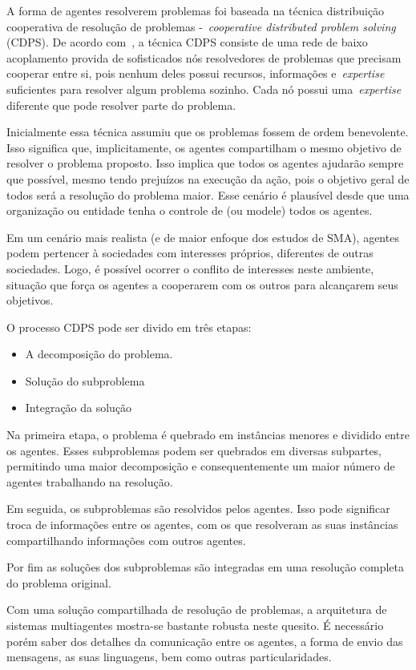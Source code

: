 A forma de agentes resolverem problemas foi baseada na técnica distribuição cooperativa de resolução de problemas -~\emph{cooperative distributed problem solving} (CDPS). De acordo com~\cite{durfee89}, a técnica CDPS consiste de uma rede de baixo acoplamento provida de sofisticados nós resolvedores de problemas que precisam cooperar entre si, pois nenhum deles possui recursos, informações e~\emph{expertise} suficientes para resolver algum problema sozinho. Cada nó possui uma~\emph{expertise} diferente que pode resolver parte do problema.

Inicialmente essa técnica assumiu que os problemas fossem de ordem benevolente. Isso significa que, implicitamente, os agentes compartilham o mesmo objetivo de resolver o problema proposto. Isso implica que todos os agentes ajudarão sempre que possível, mesmo tendo prejuízos na execução da ação, pois o objetivo geral de todos será a resolução do problema maior. Esse cenário é plausível desde que uma organização ou entidade tenha o controle de (ou modele) todos os agentes.

Em um cenário mais realista (e de maior enfoque dos estudos de SMA), agentes podem pertencer à sociedades com interesses próprios, diferentes de outras sociedades. Logo, é possível ocorrer o conflito de interesses neste ambiente, situação que força os agentes a cooperarem com os outros para alcançarem seus objetivos.

O processo CDPS pode ser divido em três etapas:
\begin{itemize}
	\item A decomposição do problema.
	\item Solução do subproblema
	\item Integração da solução
\end{itemize}

Na primeira etapa, o problema é quebrado em instâncias menores e dividido entre os agentes. Esses subproblemas podem ser quebrados em diversas subpartes, permitindo uma maior decomposição e consequentemente um maior número de agentes trabalhando na resolução.

Em seguida, os subproblemas são resolvidos pelos agentes. Isso pode significar troca de informações entre os agentes, com os que resolveram as suas instâncias compartilhando informações com outros agentes.

Por fim as soluções dos subproblemas são integradas em uma resolução completa do problema original.

Com uma solução compartilhada de resolução de problemas, a arquitetura de sistemas multiagentes mostra-se bastante robusta neste quesito. É necessário porém saber dos detalhes da comunicação entre os agentes, a forma de envio das mensagens, as suas linguagens, bem como outras particularidades.

